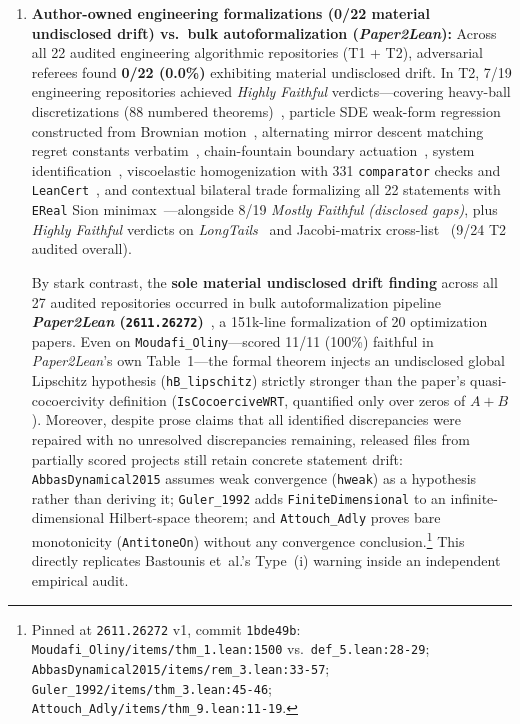 \documentclass[11pt,letterpaper]{article}
\begin{document}
\begin{enumerate}
  \item \textbf{Author-owned engineering formalizations (0/22 material undisclosed drift) vs.\ bulk autoformalization (\emph{Paper2Lean}):} Across all 22 audited engineering algorithmic repositories (T1 + T2), adversarial referees found \textbf{0/22 (0.0\%)} exhibiting material undisclosed drift. In T2, 7/19 engineering repositories achieved \emph{Highly Faithful} verdicts---covering heavy-ball discretizations (88 numbered theorems)~\cite{arxiv2611_13584}, particle SDE weak-form regression constructed from Brownian motion~\cite{arxiv2611_18455}, alternating mirror descent matching regret constants verbatim~\cite{arxiv2611_05243}, chain-fountain boundary actuation~\cite{arxiv2611_16781}, system identification~\cite{arxiv2611_18220}, viscoelastic homogenization with 331 \texttt{comparator} checks and \texttt{LeanCert}~\cite{arxiv2611_11805}, and contextual bilateral trade formalizing all 22 statements with \texttt{EReal} Sion minimax~\cite{arxiv2611_09615}---alongside 8/19 \emph{Mostly Faithful (disclosed gaps)}, plus \emph{Highly Faithful} verdicts on \emph{LongTails}~\cite{arxiv2611_13872} and Jacobi-matrix cross-list~\cite{arxiv2611_09050} (9/24 T2 audited overall).

  By stark contrast, the \textbf{sole material undisclosed drift finding} across all 27 audited repositories occurred in bulk autoformalization pipeline \textbf{\emph{Paper2Lean} (\texttt{2611.26272})}~\cite{arxiv2611_26272}, a 151k-line formalization of 20 optimization papers. Even on \texttt{Moudafi\_Oliny}---scored 11/11 (100\%) faithful in \emph{Paper2Lean}'s own Table~1---the formal theorem injects an undisclosed global Lipschitz hypothesis (\texttt{hB\_lipschitz}) strictly stronger than the paper's quasi-cocoercivity definition (\texttt{IsCocoerciveWRT}, quantified only over zeros of $A+B$). Moreover, despite prose claims that all identified discrepancies were repaired with no unresolved discrepancies remaining, released files from partially scored projects still retain concrete statement drift: \texttt{AbbasDynamical2015} assumes weak convergence (\texttt{hweak}) as a hypothesis rather than deriving it; \texttt{Guler\_1992} adds \texttt{FiniteDimensional} to an infinite-dimensional Hilbert-space theorem; and \texttt{Attouch\_Adly} proves bare monotonicity (\texttt{AntitoneOn}) without any convergence conclusion.\footnote{Pinned at \texttt{2611.26272} v1, commit \texttt{1bde49b}: \texttt{Moudafi\_Oliny/items/thm\_1.lean:1500} vs.\ \texttt{def\_5.lean:28-29}; \texttt{AbbasDynamical2015/items/rem\_3.lean:33-57}; \texttt{Guler\_1992/items/thm\_3.lean:45-46}; \texttt{Attouch\_Adly/items/thm\_9.lean:11-19}.} This directly replicates Bastounis et~al.'s Type~(i) warning inside an independent empirical audit.


\end{enumerate}
\end{document}
